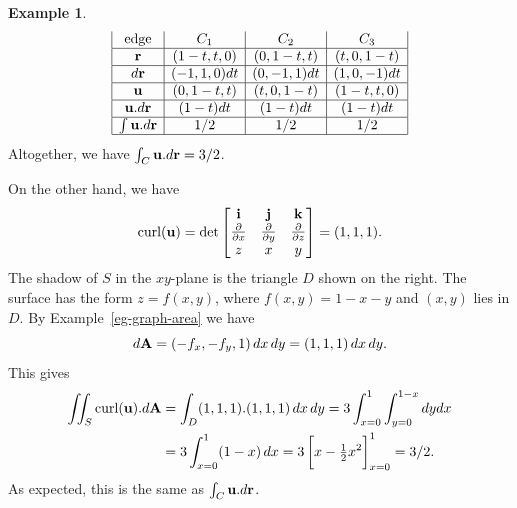 \documentclass[reqno]{amsart}
\theoremstyle{definition}
\newtheorem{example}[theorem]{Example}
\begin{document}
\begin{example}
\[\begin{array}{|c|c|c|c|}
     \text{ edge } & C_1        & C_2        & C_3        \\ \hline
     \mathbf{r}           & (1-t,t,0)  & (0,1-t,t)  & (t,0,1-t)  \\ \hline
     d\mathbf{r}          & (-1,1,0)dt & (0,-1,1)dt & (1,0,-1)dt \\ \hline
     \mathbf{u}           & (0,1-t,t)  & (t,0,1-t)  & (1-t,t,0)  \\ \hline
     \mathbf{u}.d\mathbf{r}      & (1-t)dt    & (1-t)dt    & (1-t)dt    \\ \hline
     \int\mathbf{u}.d\mathbf{r}  & 1/2        & 1/2        & 1/2        \\ \hline
    \end{array}
 \]
 Altogether, we have $\int_C\mathbf{u}.d\mathbf{r}=3/2$.

 On the other hand, we have
 \[ \operatorname{curl}(\mathbf{u}) = 
     \det\left[\begin{matrix} \mathbf{i}  & \mathbf{j}  & \mathbf{k}  \\
              \frac{\partial}{\partial x} & \frac{\partial}{\partial y} & \frac{\partial}{\partial z} \\
              z    & x    & y    \end{matrix}\right] = (1,1,1).
 \]
 The shadow of $S$ in the $xy$-plane is the triangle $D$ shown on the
 right.  The surface has the form $z=f(x,y)$, where $f(x,y)=1-x-y$ and
 $(x,y)$ lies in $D$.  By Example~\ref{eg-graph-area} we have
 \[ d\mathbf{A} = (-f_x,-f_y,1)\,dx\,dy = (1,1,1)\,dx\,dy. \]
 This gives
 \begin{align*}
  \iint_S \curl(\vu).d\vA
   &= \int_D (1,1,1).(1,1,1)\,dx\,dy 
    = 3 \int_{x=0}^1\int_{y=0}^{1-x} dy dx \\
   &= 3 \int_{x=0}^1(1-x)\,dx = 3\CH{x-\half{x^2}}_{x=0}^1 = 3/2.
 \end{align*}
 As expected, this is the same as $\int_C\mathbf{u}.d\mathbf{r}$.
\end{example}
\end{document}
